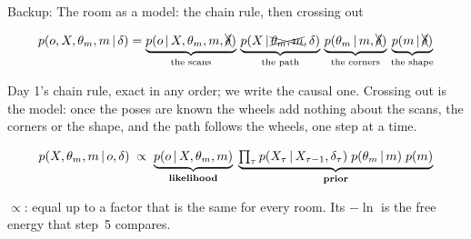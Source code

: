 \documentclass[10pt, aspectratio=169]{beamer}
\begin{document}
\begin{frame}{Backup: The room as a model: the chain rule, then crossing out}
  \centering
  {\footnotesize{}\par}
  \vspace{0.3em}
  \setlength{\abovedisplayskip}{3pt}\setlength{\belowdisplayskip}{3pt}
  \[
    p(o,X,\theta_m,m\,|\,\delta) =
    \underbrace{p(o\,|\, X,\theta_m,m,\xcancel{\delta})}_{\text{the scans}}\,
    \underbrace{p(X\,|\, \xcancel{\theta_m,m},\delta)}_{\text{the path}}\,
    \underbrace{p(\theta_m\,|\, m,\xcancel{\delta})}_{\text{the corners}}\,
    \underbrace{p(m\,|\, \xcancel{\delta})}_{\text{the shape}}
  \]
  {\footnotesize Day 1's chain rule, exact in any order; we write the causal one. Crossing out is the model:
  once the poses are known the wheels add nothing about the scans, the corners or the shape, and the path
  follows the wheels, one step at a time.\par}
  \[
    p(X,\theta_m,m\,|\, o,\delta)\;\propto\;
    \underbrace{p(o\,|\, X,\theta_m,m)}_{\textbf{likelihood}}\;
    \underbrace{\textstyle\prod_\tau p(X_\tau\,|\, X_{\tau-1},\delta_\tau)\;p(\theta_m\,|\, m)\;p(m)}_{\textbf{prior}}
  \]
  {\footnotesize $\propto$: equal up to a factor that is the same for every room. Its $-\ln$ is the free energy that step~5 compares.\par}
\end{frame}
\end{document}
